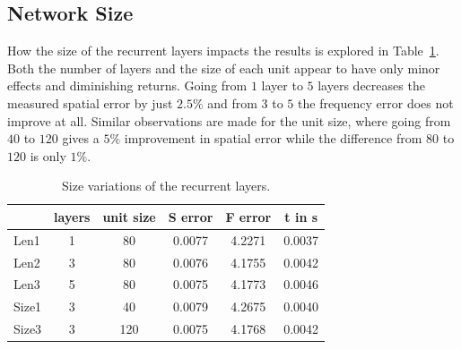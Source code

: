 \documentclass[sigconf]{acmart}
\begin{document}
\subsection{Network Size}
How the size of the recurrent layers impacts the results is explored in Table~\ref{tab:size}. Both the number of layers and the size of each unit appear to have only minor effects and diminishing returns. Going from $1$ layer to $5$ layers decreases the measured spatial error by just $2.5\%$ and from $3$ to $5$ the frequency error does not improve at all.
Similar observations are made for the unit size, where going from $40$ to $120$ gives a $5\%$ improvement in spatial error while the difference from $80$ to $120$ is only $1\%$.
\begin{table}
	\centering
	\caption{Size variations of the recurrent layers.}
	\label{tab:size}
	\begin{tabular}{lccccc}
		\hline
		      & layers & unit size & S error & F error & t in s \\ \hline
		Len1  &   1    &    80     & 0.0077  & 4.2271  & 0.0037 \\
		Len2  &   3    &    80     & 0.0076  & 4.1755  & 0.0042 \\
		Len3  &   5    &    80     & 0.0075  & 4.1773  & 0.0046 \\
		Size1 &   3    &    40     & 0.0079  & 4.2675  & 0.0040 \\ 
		Size3 &   3    &    120    & 0.0075  & 4.1768  & 0.0042 \\ \hline
	\end{tabular}
\end{table}
\end{document}
